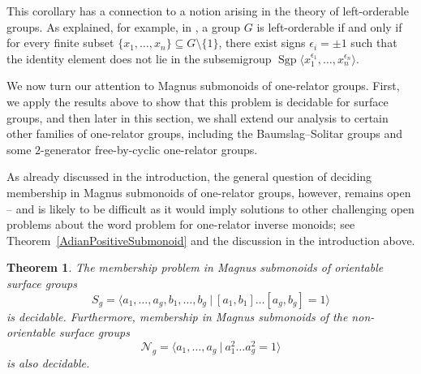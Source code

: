 \documentclass[11pt]{amsart}
\newcommand{\Sgen}[1]{\operatorname{Sgp}\bigl\langle #1 \bigr\rangle}
\newcommand{\Gpres}[2]{\bigl\langle #1\:|\:#2 \bigr\rangle}
\theoremstyle{plain}
\newtheorem{theorem}{Theorem}[section]
\theoremstyle{definition}
\begin{document}
This corollary has a connection to a notion arising in the theory of left-orderable groups. As explained, for example, in \cite[Theorem~1.48]{clay2016ordered}, a group $G$ is left-orderable if and only if for every finite subset $\{x_1, \ldots, x_n\} \subseteq G \setminus \{1\}$, there exist signs $\epsilon_i = \pm 1$ such that the identity element does not lie in the subsemigroup $\Sgen{x_1^{\epsilon_1}, \ldots, x_n^{\epsilon_n}}$.      


We now turn our attention to Magnus submonoids of one-relator groups. First, we apply the results above to show that this problem is decidable for surface groups, and then later in this section, we shall extend our analysis to certain other families of one-relator groups, including the Baumslag--Solitar groups and some $2$-generator free-by-cyclic one-relator groups.

As already discussed in the introduction, the general question of deciding membership in Magnus submonoids of one-relator groups, however, remains open -- and is likely to be difficult as it would imply solutions to other challenging open problems about the word problem for one-relator inverse monoids; see Theorem~\ref{AdianPositiveSubmonoid} and the discussion in the introduction above.  


 
\begin{theorem}\label{thm:MagnusSubmonoidsSurfaceGroupsGeneral}
The membership problem in Magnus submonoids of orientable surface groups  
\[
S_g = \Gpres{a_1, \ldots, a_g, b_1, \ldots, b_g}{[a_1,b_1]\ldots[a_g,b_g]= 1}
\]
is decidable. Furthermore, membership in Magnus submonoids of the non-orientable surface groups 
\[
\mathcal{N}_g = \Gpres{a_1, \ldots, a_g}{a_1^2 \ldots a_g^2= 1}
\]
is also decidable.
\end{theorem}
\end{document}

